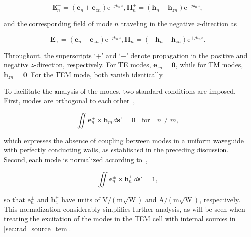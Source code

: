\begin{subequations}
	\begin{equation}
		\mathbf{E}_n^+ = \left(\mathbf{e}_n + \mathbf{e}_{zn}\right)\mathrm{e}^{-jk_n z},
	\end{equation}
	\begin{equation}
		\mathbf{H}_n^+ = \left(\mathbf{h}_n + \mathbf{h}_{zn}\right)\mathrm{e}^{-jk_n z},
	\end{equation}
\end{subequations}

and the corresponding field of mode $n$ traveling in the negative $z$-direction as \cite[p.~359]{Collin_2015}

\begin{subequations}
	\begin{equation}
		\mathbf{E}_n^- = \left(\mathbf{e}_n - \mathbf{e}_{zn}\right)\mathrm{e}^{+jk_n z},
	\end{equation}
	\begin{equation}
		\mathbf{H}_n^- = \left(-\mathbf{h}_n + \mathbf{h}_{zn}\right)\mathrm{e}^{+jk_n z}.
	\end{equation}
\end{subequations}

Throughout, the superscripts `$+$' and `$-$' denote propagation in the positive and negative $z$-direction, respectively. For TE modes, $\mathbf{e}_{zn} = \mathbf{0}$, while for TM modes, $\mathbf{h}_{zn} = \mathbf{0}$. For the TEM mode, both vanish identically.

To facilitate the analysis of the modes, two standard conditions are imposed. First, modes are orthogonal to each other~\cite[p.~359]{Collin_2015},

\begin{equation}
	\iint \mathbf{e}_n^\pm \times \mathbf{h}_m^\pm \, d\mathbf{s'} = 0 
	\quad \text{for} \quad n \neq m,
	\label{eqn:norm_power}
\end{equation}

which expresses the absence of coupling between modes in a uniform waveguide with perfectly conducting walls, as established in the preceding discussion. Second, each mode is normalized according to~\cite[p.~359]{Collin_2015},

\begin{equation}
	\iint \mathbf{e}_n^\pm \times \mathbf{h}_n^\pm \, d\mathbf{s'} = 1,
	\label{eqn:unit_power}
\end{equation}

so that $\mathbf{e}_n^\pm$ and $\mathbf{h}_n^\pm$ have units of 
$\mathrm{V/(m\sqrt{W})}$ and $\mathrm{A/(m\sqrt{W})}$, respectively. This normalization considerably simplifies further analysis, 
as will be seen when treating the excitation of the modes in the TEM cell 
with internal sources in \cref{sec:rad_source_tem}.

